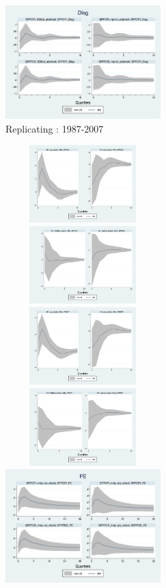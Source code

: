 \documentclass[]{article}
\begin{document}
\begin{figure}[h]
		\includegraphics[width=6cm]{figures/SPFDisg_ab_ashocks.png} 
	\caption{ Replicating \cite{coibion2012can}: 1987-2007}
\end{figure}


\begin{figure}[h]\label{ReplicateCoibionpost2007}
	\centering
	\includegraphics[width=6cm,height=3cm]{figures/CPIAU_ashocks_nmp_post2007.png}  
	\includegraphics[width=6cm,height=3cm]{figures/CPIAU_ashocks_post2007.png} \\
	\includegraphics[width=6cm,height=3cm]{figures/PCEPI_ashocks_nmp_post2007.png} 
	\includegraphics[width=6cm,height=3cm]{figures/PCEPI_ashocks_post2007.png}  \\
	\smallskip
	\includegraphics[width=6cm]{figures/SPFFE_ashocks_nmp_post2007.png} 

\end{figure}
\end{document}
